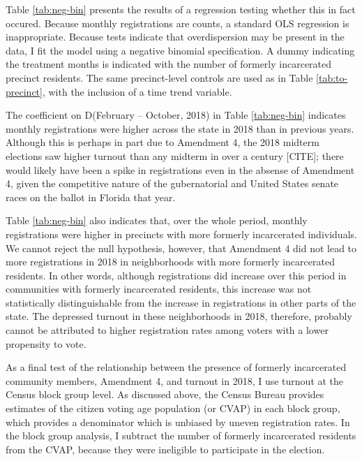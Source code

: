 \documentclass[
  12pt,
]{article}
\begin{document}
Table \ref{tab:neg-bin} presents the results of a regression testing whether this in fact occured. Because monthly registrations are counts, a standard OLS regression is inappropriate. Because tests indicate that overdispersion may be present in the data, I fit the model using a negative binomial specification. A dummy indicating the treatment months is indicated with the number of formerly incarcerated precinct residents. The same precinct-level controls are used as in Table \ref{tab:to-precinct}, with the inclusion of a time trend variable.

\begin{singlespace}


\end{singlespace}

The coefficient on D(February -- October, 2018) in Table \ref{tab:neg-bin} indicates monthly registrations were higher across the state in 2018 than in previous years. Although this is perhaps in part due to Amendment 4, the 2018 midterm elections saw higher turnout than any midterm in over a century {[}CITE{]}; there would likely have been a spike in registrations even in the absense of Amendment 4, given the competitive nature of the gubernatorial and United States senate races on the ballot in Florida that year.

Table \ref{tab:neg-bin} also indicates that, over the whole period, monthly registrations were higher in precincts with more formerly incarcerated individuals. We cannot reject the null hypothesis, however, that Amendment 4 did not lead to more registrations in 2018 in neighborhoods with more formerly incarcerated residents. In other words, although registrations did increase over this period in communities with formerly incarcerated residents, this increase was not statistically distinguishable from the increase in registrations in other parts of the state. The depressed turnout in these neighborhoods in 2018, therefore, probably cannot be attributed to higher registration rates among voters with a lower propensity to vote.

As a final test of the relationship between the presence of formerly incarcerated community members, Amendment 4, and turnout in 2018, I use turnout at the Census block group level. As discussed above, the Census Bureau provides estimates of the citizen voting age population (or CVAP) in each block group, which provides a denominator which is unbiased by uneven registration rates. In the block group analysis, I subtract the number of formerly incarcerated residents from the CVAP, because they were ineligible to participate in the election.
\end{document}
